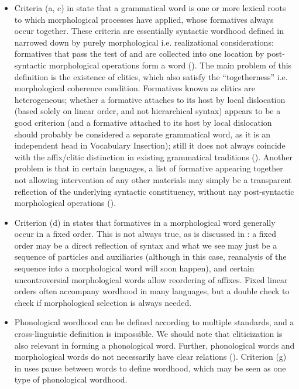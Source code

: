 \documentclass[a4paper, oneside, scheme=plain, 12pt]{article}
\newcommand*{\citepage}[1]{p.~{#1}}
\newcommand*{\citepages}[1]{pp.~{#1}}
\begin{document}
\begin{itemize}
    \item Criteria (a, c) in \citet[\citepages{13-16}]{dixon2010basic2} state that 
    a grammatical word is one or more lexical roots to which morphological processes have applied,
    whose formatives always occur together.
    These criteria are essentially syntactic wordhood defined in 
    narrowed down by purely morphological i.e. realizational considerations:
    formatives that pass the test of  
    and are collected into one location by post-syntactic morphological operations
    form a word ().
    The main problem of this definition is the existence of clitics,
    which also satisfy the ``togetherness'' i.e. morphological coherence condition.
    Formatives known as clitics are heterogeneous; whether a formative attaches to its host by local dislocation (based solely on linear order, and not hierarchical syntax) appears to be a good criterion (and a formative attached to its host by local dislocation should probably be considered a separate grammatical word, as it is an independent head in Vocabulary Insertion); still it does not always coincide with the affix/clitic distinction in existing grammatical traditions ().
    Another problem is that in certain languages,
    a list of formative appearing together not allowing intervention of any other materials
    may simply be a transparent reflection of the underlying syntactic constituency, without nay post-syntactic morphological operations ().
    
    \item Criterion (d) in \citet[\citepage{14}]{dixon2010basic2} states that formatives in a morphological word generally occur in a fixed order.
    This is not always true, as is discussed in :
    a fixed order may be a direct reflection of syntax
    and what we see may just be a sequence of particles and auxiliaries
    (although in this case, reanalysis of the sequence into a morphological word will soon happen),
    and certain uncontroversial morphological words allow reordering of affixes.
    Fixed linear orders often accompany wordhood in many languages,
    but a double check to check if morphological selection is always needed.

    \item Phonological wordhood can be defined according to multiple standards,
    and a cross-linguistic definition is impossible.
    We should note that cliticization is also relevant in forming a phonological word.
    Further, phonological words and morphological words do not necessarily have clear relations
    ().
    Criterion (g) in \citet[\citepage{18}]{dixon2010basic2} uses pause between words to define  wordhood, which may be seen as one type of phonological wordhood.
\end{itemize}
\end{document}
